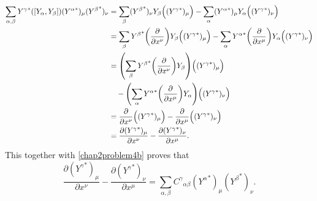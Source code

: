\documentclass{note}
\numberwithin{equation}{chapter}
\newcommand{\pdv}[2]{\frac{\partial #1}{\partial #2}}
\begin{document}
\begin{align*}
    \sum_{\alpha,\beta}
    {Y^\gamma}^*([Y_\alpha, Y_\beta]) ({Y^\alpha}^*)_\mu({Y^\beta}^*)_\nu
     & = \sum_\beta ({Y^\beta}^*)_\nu Y_\beta\Big(({Y^\gamma}^*)_\mu\Big)
    - \sum_\alpha ({Y^\alpha}^*)_\mu Y_\alpha\Big(({Y^\gamma}^*)_\nu\Big)   \\
     & = \sum_\beta {Y^\beta}^*\prn{\pdv{}{x^\nu}}Y_\beta
    \Big(({Y^\gamma}^*)_\mu\Big)
    - \sum_\alpha {Y^\alpha}^*\prn{\pdv{}{x^\mu}}Y_\alpha
    \Big(({Y^\gamma}^*)_\nu\Big)                                            \\
     & = \prn{\sum_\beta {Y^\beta}^*\prn{\pdv{}{x^\nu}}Y_\beta}
    \Big(({Y^\gamma}^*)_\mu\Big)                                            \\
     & \quad - \prn{\sum_\alpha {Y^\alpha}^*\prn{\pdv{}{x^\mu}}Y_\alpha}
    \Big(({Y^\gamma}^*)_\nu\Big)                                            \\
     & = \pdv{}{x^\nu}\Big(({Y^\gamma}^*)_\mu\Big)
    - \pdv{}{x^\mu}\Big(({Y^\gamma}^*)_\nu\Big)                             \\
     & = \pdv{({Y^\gamma}^*)_\mu}{x^\nu} - \pdv{({Y^\gamma}^*)_\nu}{x^\mu}.
\end{align*}
This together with \eqref{chap2problem4b} proves that
\begin{equation*}
    \pdv{({Y^\gamma}^*)_\mu}{x^\nu} - \pdv{({Y^\gamma}^*)_\nu}{x^\mu} =
    \sum_{\alpha,\beta} {C^\gamma}_{\alpha\beta}
    ({Y^\alpha}^*)_\mu({Y^\beta}^*)_\nu.
\end{equation*}
\end{document}
